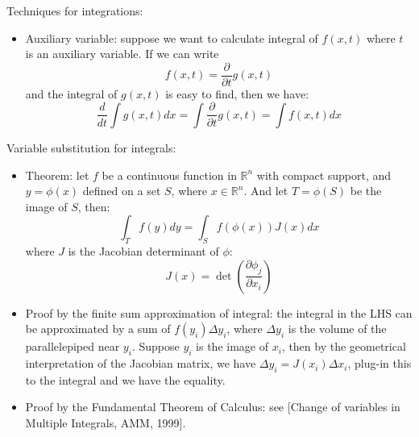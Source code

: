 \documentclass{report}
\begin{document}
Techniques for integrations: 
\begin{itemize}
	\item Auxiliary variable: suppose we want to calculate integral of $f(x,t)$ where $t$ is an auxiliary variable. If we can write
	\begin{equation}
	f(x,t) = \frac{\partial}{\partial t} g(x,t)	
	\end{equation}
	and the integral of $g(x,t)$ is easy to find, then we have: 
	\begin{equation}
	\frac{d}{d t} \int g(x,t) dx = \int \frac{\partial}{\partial t} g(x,t) = \int f(x,t) dx	
	\end{equation}
	
\end{itemize}

Variable substitution for integrals: 
\begin{itemize}
\item Theorem: let $f$ be a continuous function in $\mathbb{R}^n$ with compact support, and $y = \phi(x)$ defined on a set $S$, where $x \in \mathbb{R}^n$. And let $T = \phi(S)$ be the image of $S$, then: 
\begin{equation}
\int_T f(y) dy = \int_S f(\phi(x)) J(x) dx	
\end{equation}
where $J$ is the Jacobian determinant of $\phi$: 
\begin{equation}
J(x) = \det \left(\frac{\partial \phi_j}{\partial x_i}\right)
\end{equation}

\item Proof by the finite sum approximation of integral: the integral in the LHS can be approximated by a sum of $f(y_i) \Delta y_i$, where $\Delta y_i$ is the volume of the parallelepiped near $y_i$. Suppose $y_i$ is the image of $x_i$, then by the geometrical interpretation of the Jacobian matrix, we have $\Delta y_i = J(x_i) \Delta x_i$, plug-in this to the integral and we have the equality. 

\item Proof by the Fundamental Theorem of Calculus: see [Change of variables in Multiple Integrals, AMM, 1999]. 
\end{itemize}
\end{document}

